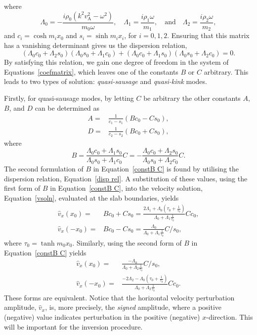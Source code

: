 where
\begin{equation}
\Lambda_0 = -\frac{i\rho_0(k^2v_\textrm{A}^2 - \omega^2)}{m_0\omega}, \quad \Lambda_1 = \frac{i\rho_1\omega}{m_1}, \quad \text{and} \quad \Lambda_2 = \frac{i\rho_2\omega}{m_2}, \label{Lambdas}
\end{equation}
and $c_i = \cosh{m_ix_0}$ and $s_i = \sinh{m_ix_i}$, for $i = 0, 1, 2$. Ensuring that this matrix has a vanishing determinant gives us the dispersion relation,
\begin{equation}
(\Lambda_0c_0 + \Lambda_2s_0)(\Lambda_0s_0 + \Lambda_1c_0) + (\Lambda_0c_0 + \Lambda_1s_0)(\Lambda_0s_0 + \Lambda_2c_0) = 0. \label{disp rel}
\end{equation}
By satisfying this relation, we gain one degree of freedom in the system of Equations~\eqref{coefmatrix}, which leaves one of the constants $B$ or $C$ arbitrary. This leads to two types of solution: \textit{quasi-sausage} and \textit{quasi-kink} modes.

Firstly, for quasi-sausage modes, by letting $C$ be arbitrary the other constants $A$, $B$, and $D$ can be determined as
\begin{align}
A =& \frac{1}{c_1 - s_1}(Bc_0 - Cs_0), \label{constA C} \\ 
D =& \frac{1}{c_2 - s_2}(Bc_0 + Cs_0), \label{constD C}
\end{align}
where
\begin{equation}
B = \frac{\Lambda_0c_0 + \Lambda_1s_0}{\Lambda_0s_0 + \Lambda_1c_0}C = -\frac{\Lambda_0c_0 + \Lambda_2s_0}{\Lambda_0s_0 + \Lambda_2c_0}C. \label{constB C}
\end{equation}
The second formulation of $B$ in Equation~\eqref{constB C} is found by utilising the dispersion relation, Equation~\eqref{disp rel}. A substitution of these values, using the first form of $B$ in Equation~\eqref{constB C}, into the velocity solution, Equation~\eqref{vsoln}, evaluated at the slab boundaries, yields
\begin{align}
\hat{v}_x(x_0) =& Bc_0 + Cs_0 = \frac{2\Lambda_1 + \Lambda_0\left(\tau_0 + \frac{1}{\tau_0}\right)}{\Lambda_0 + \Lambda_1\frac{1}{\tau_0}}Cc_0, \label{vx_01 C} \\
\hat{v}_x(-x_0) =& Bc_0 - Cs_0 = \frac{\Lambda_0}{\Lambda_0 + \Lambda_1\frac{1}{\tau_0}}C/s_0, \label{v-x_01 C}
\end{align}
where $\tau_0 = \tanh{m_0x_0}$. Similarly, using the second form of $B$ in Equation~\eqref{constB C} yields
\begin{align}
\hat{v}_x(x_0) =& \frac{-\Lambda_0}{\Lambda_0 + \Lambda_2\frac{1}{\tau_0}}C/s_0, \label{vx_02 C} \\
\hat{v}_x(-x_0) =& \frac{-2\Lambda_2 - \Lambda_0\left(\tau_0 + \frac{1}{\tau_0}\right)}{\Lambda_0 + \Lambda_2\frac{1}{\tau_0}}Cc_0. \label{v-x_02 C}
\end{align}
These forms are equivalent. Notice that the horizontal velocity perturbation amplitude, $\hat{v}_x$, is, more precisely, the \emph{signed} amplitude, where a positive (negative) value indicates perturbation in the positive (negative) $x$-direction. This will be important for the inversion procedure.

